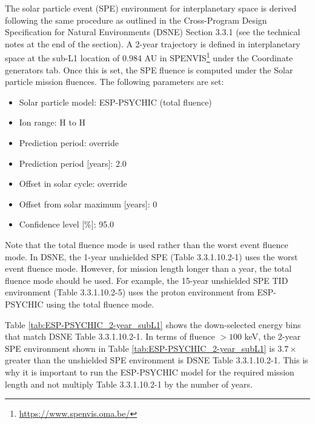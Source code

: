 \documentclass{hitec}
\begin{document}
The solar particle event (SPE) environment for interplanetary space is derived following the same procedure as outlined in the Cross-Program Design Specification for Natural Environments (DSNE) Section 3.3.1 (see the technical notes at the end of the section). A 2-year trajectory is defined in interplanetary space at the sub-L1 location of 0.984 AU in SPENVIS\footnote{\url{https://www.spenvis.oma.be/}} under the \textsf{Coordinate generators} tab. Once this is set, the SPE fluence is computed under the \textsf{Solar particle mission fluences}. The following parameters are set:
\begin{itemize}
	\item Solar particle model: ESP-PSYCHIC (total fluence)
	\item Ion range: H to H
	\item Prediction period: override
	\item Prediction period [years]: 2.0
	\item Offset in solar cycle: override
	\item Offset from solar maximum [years]: 0
	\item Confidence level [\%]: 95.0
\end{itemize}

Note that the \textsf{total fluence} mode is used rather than the \textsf{worst event fluence} mode. In DSNE, the 1-year unshielded SPE (Table 3.3.1.10.2-1) uses the \textsf{worst event fluence} mode. However, for mission length longer than a year, the \textsf{total fluence} mode should be used. For example, the 15-year unshielded SPE TID environment (Table 3.3.1.10.2-5) uses the proton environment from ESP-PSYCHIC using the \textsf{total fluence} mode.

Table \ref{tab:ESP-PSYCHIC_2-year_subL1} shows the down-selected energy bins that match DSNE Table 3.3.1.10.2-1. In terms of fluence $> 100$ keV, the 2-year SPE environment shown in Table \ref{tab:ESP-PSYCHIC_2-year_subL1} is $3.7\times$ greater than the unshielded SPE environment is DSNE Table 3.3.1.10.2-1.%
This is why it is important to run the ESP-PSYCHIC model for the required mission length and not multiply Table 3.3.1.10.2-1 by the number of years.%
\end{document}
